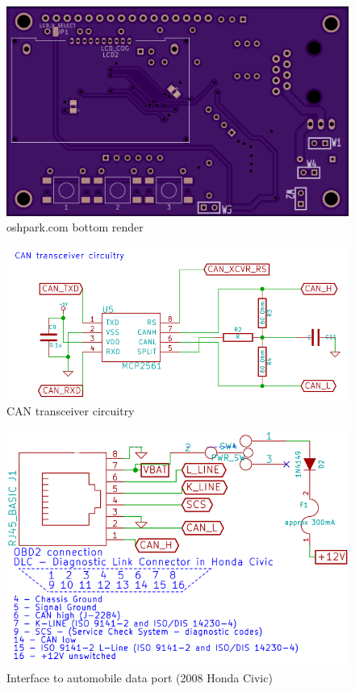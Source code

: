 \documentclass{article}
\begin{document}
\begin{figure}[H]
\centering
\includegraphics[width=180mm,angle=90]{../images/canobd2v1bot.png}
\caption{oshpark.com bottom render}
\label{}
\end{figure}

\begin{figure}[H]
\centering
\includegraphics[width=140mm,angle=0]{../images/can_transceiver.png}
\caption{CAN transceiver circuitry}
\label{}
\end{figure}

\begin{figure}[H]
\centering
\includegraphics[width=140mm,angle=0]{../images/car_interface.png}
\caption{Interface to automobile data port (2008 Honda Civic)}
\label{}
\end{figure}
\end{document}
